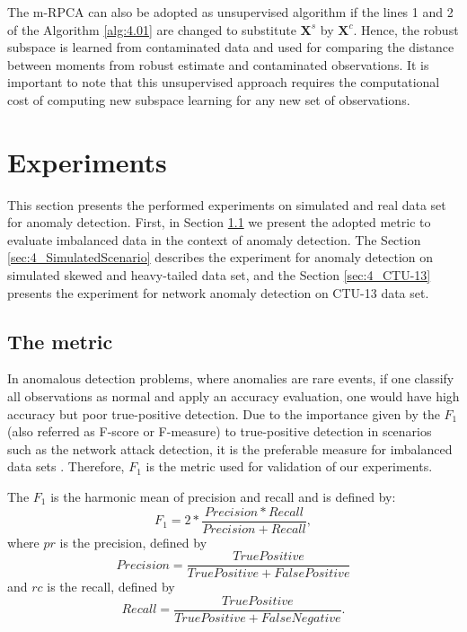 The m-RPCA can also be adopted as unsupervised algorithm if the lines 1 and 2 of the Algorithm \ref{alg:4.01} are changed to substitute $\pmb{X}^s$ by $\pmb{X}^c$. Hence, the robust subspace is learned from contaminated data and used for comparing the distance between moments from robust estimate and contaminated observations. It is important to note that this unsupervised approach requires the computational cost of computing new subspace learning for any new set of observations.


\section{Experiments}
\label{sec:4_experiments}

This section presents the performed experiments on simulated and real data set for anomaly detection. First, in Section \ref{sec:4_metric} we present the adopted metric to evaluate imbalanced data in the context of anomaly detection. The Section \ref{sec:4_SimulatedScenario} describes the experiment for anomaly detection on simulated skewed and heavy-tailed data set, and the Section \ref{sec:4_CTU-13} presents the experiment for network anomaly detection on CTU-13 data set.

\subsection{The metric}
\label{sec:4_metric}

In anomalous detection problems, where anomalies are rare events, if one classify all observations as normal and apply an accuracy evaluation, one would have high accuracy but poor true-positive detection. Due to the importance given by the $F_1$ (also referred as F-score or F-measure) to true-positive detection in scenarios such as the network attack detection, it is the preferable measure for imbalanced data sets \cite{powers2011evaluation,moustafa2019holistic}. Therefore, $F_1$ is the metric used for validation of our experiments.

The $F_1$ is the harmonic mean of precision and recall and is defined by:
\begin{equation}\label{eq:4.15}
	F_1 = 2 * \frac{Precision * Recall}{Precision + Recall},
\end{equation}
where $pr$ is the precision, defined by 
\begin{equation}\label{eq:4.16}
	Precision = \frac{True Positive}{True Positive + False Positive}
\end{equation}
and $rc$ is the recall, defined by 
\begin{equation}\label{eq:4.17}
	Recall = \frac{True Positive}{True Positive + False Negative}.
\end{equation}


